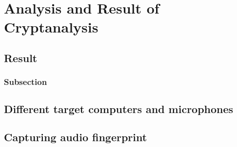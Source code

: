 \chapter{Analysis and Result of Cryptanalysis}
\label{chp:analysis_result} 

\section{Result}\label{sec:result}

\subsection{Subsection}\label{sec:first_ssection}


\section{Different target computers and microphones}\label{sec:different_target_computers}


\section{Capturing audio fingerprint}\label{sec:capturing_audio_fingerprint}